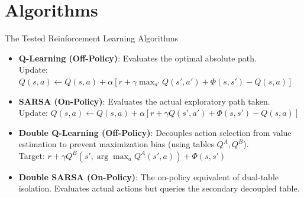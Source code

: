 \documentclass[10pt, aspectratio=169]{beamer}
\begin{document}
\section{Algorithms}
\begin{frame}{The Tested Reinforcement Learning Algorithms}
    \begin{itemize}
        \item \textbf{Q-Learning (Off-Policy)}: Evaluates the optimal absolute path. \\
        Update: $Q(s, a) \leftarrow Q(s, a) + \alpha [ r + \gamma \max_{a'} Q(s', a') + \Phi(s, s') - Q(s, a) ]$
        
        \item \textbf{SARSA (On-Policy)}: Evaluates the actual exploratory path taken. \\
        Update: $Q(s, a) \leftarrow Q(s, a) + \alpha [ r + \gamma Q(s', a') + \Phi(s, s') - Q(s, a) ]$
        
        \item \textbf{Double Q-Learning (Off-Policy)}: Decouples action selection from value estimation to prevent maximization bias (using tables $Q^A, Q^B$). \\
        Target: $r + \gamma Q^B(s', \arg\max_{a} Q^A(s', a)) + \Phi(s, s')$
        
        \item \textbf{Double SARSA (On-Policy)}: The on-policy equivalent of dual-table isolation. Evaluates actual actions but queries the secondary decoupled table.
    \end{itemize}
\end{frame}

\end{document}
